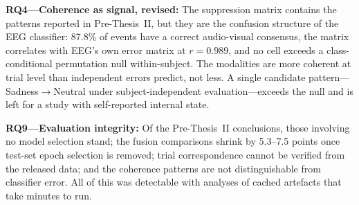 \textbf{RQ4---Coherence as signal, revised:} The suppression matrix contains the
patterns reported in Pre-Thesis~II, but they are the confusion structure of the EEG
classifier: 87.8\% of events have a correct audio-visual consensus, the matrix
correlates with EEG's own error matrix at $r = 0.989$, and no cell exceeds a
class-conditional permutation null within-subject. The modalities are more coherent at
trial level than independent errors predict, not less. A single candidate
pattern---Sadness$\rightarrow$Neutral under subject-independent evaluation---exceeds
the null and is left for a study with self-reported internal state.

\textbf{RQ9---Evaluation integrity:} Of the Pre-Thesis~II conclusions, those involving
no model selection stand; the fusion comparisons shrink by 5.3--7.5 points once
test-set epoch selection is removed; trial correspondence cannot be verified from the
released data; and the coherence patterns are not distinguishable from classifier
error. All of this was detectable with analyses of cached artefacts that take minutes
to run.
